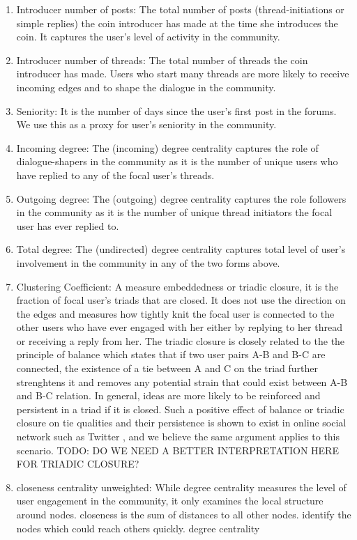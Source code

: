 \begin{enumerate}[topsep=0pt,itemsep=-1ex,partopsep=1ex,parsep=1ex]
  \item{Introducer number of posts:} The total number of posts (thread-initiations or simple replies) the coin introducer has made at the time she introduces the coin. It captures the user's level of activity in the community.
  \item{Introducer number of threads:} The total number of threads the coin introducer has made. Users who start many threads are more likely to receive incoming edges and to shape the dialogue in the community.
  \item{Seniority:} It is the number of days since the user's first post in the forums. We use this as a proxy for user's seniority in the community.
  \item{Incoming degree:} The (incoming) degree centrality captures the role of dialogue-shapers in the community as it is the number of unique users who have replied to any of the focal user's threads.
  \item{Outgoing degree:} The (outgoing) degree centrality captures the role followers in the community as it is the number of unique thread initiators the focal user has ever replied to.
  \item{Total degree:} The (undirected) degree centrality captures total level of user's involvement in the community in any of the two forms above.
  \item{Clustering Coefficient:} A measure embeddedness or triadic closure, it is the fraction of focal user's triads that are closed. It does not use the direction on the edges and measures how tightly knit the focal user is connected to the other users who have ever engaged with her either by replying to her thread or receiving a reply from her. The triadic closure is closely related to the the principle of balance which states that if two user pairs A-B and B-C are connected, the existence of a tie between A and C on the triad further strenghtens it and removes any potential strain that could exist between A-B and B-C relation. In general, ideas are more likely to be reinforced and persistent in a triad if it is closed. Such a positive effect of balance or triadic closure on tie qualities and their persistence is shown to exist in online social network such as Twitter \cite{KleinbergBalance}, and we believe the same argument applies to this scenario.
  TODO: DO WE NEED A BETTER INTERPRETATION HERE FOR TRIADIC CLOSURE?
  \item{closeness centrality unweighted:} While degree centrality measures the level of user engagement in the community, it only examines the local structure around nodes. closeness  is the sum of distances to all other nodes. identify the nodes which could reach others quickly. degree centrality 

\end{enumerate}
